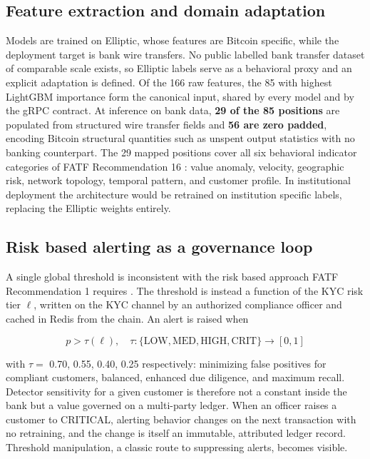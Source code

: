 \documentclass[conference]{IEEEtran}
\begin{document}
\subsection{Feature extraction and domain adaptation}
\label{sec:features}

Models are trained on Elliptic, whose features are Bitcoin specific, while the
deployment target is bank wire transfers. No public labelled bank transfer
dataset of comparable scale exists, so Elliptic labels serve as a behavioral
proxy and an explicit adaptation is defined. Of the 166 raw features, the 85
with highest LightGBM importance form the canonical input, shared by every model
and by the gRPC contract. At inference on bank data, \textbf{29 of the 85
positions} are populated from structured wire transfer fields and \textbf{56 are
zero padded}, encoding Bitcoin structural quantities such as unspent output
statistics with no banking counterpart. The 29 mapped positions cover all six
behavioral indicator categories of FATF Recommendation 16 \cite{fatf2023}: value
anomaly, velocity, geographic risk, network topology, temporal pattern, and
customer profile. In institutional deployment the architecture would be
retrained on institution specific labels, replacing the Elliptic weights
entirely.

\subsection{Risk based alerting as a governance loop}

A single global threshold is inconsistent with the risk based approach FATF
Recommendation 1 requires \cite{fatf2023}. The threshold is instead a function
of the KYC risk tier $\ell$, written on the KYC channel by an authorized
compliance officer and cached in Redis from the chain. An alert is raised when

\begin{equation}
p > \tau(\ell), \quad
\tau: \{\mathrm{LOW},\mathrm{MED},\mathrm{HIGH},\mathrm{CRIT}\} \rightarrow [0,1]
\label{eq:threshold}
\end{equation}

with $\tau =$ 0.70, 0.55, 0.40, 0.25 respectively: minimizing false positives
for compliant customers, balanced, enhanced due diligence, and maximum recall.
Detector sensitivity for a given customer is therefore not a constant inside the
bank but a value governed on a multi-party ledger. When an officer raises a
customer to CRITICAL, alerting behavior changes on the next transaction with no
retraining, and the change is itself an immutable, attributed ledger record.
Threshold manipulation, a classic route to suppressing alerts, becomes visible.
\end{document}
